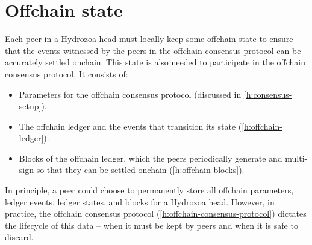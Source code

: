 \documentclass[../hydrozoa.tex]{subfiles}
\begin{document}
\chapter{Offchain state}%
\label{h:offchain-state}

Each peer in a Hydrozoa head must locally keep some offchain state to ensure that the events witnessed by the peers in the offchain consensus protocol can be accurately settled onchain.
This state is also needed to participate in the offchain consensus protocol.
It consists of:
\begin{itemize}
  \item Parameters for the offchain consensus protocol (discussed in \cref{h:consensus-setup}).
  \item The offchain ledger and the events that transition its state (\cref{h:offchain-ledger}).
  \item Blocks of the offchain ledger, which the peers periodically generate and multi-sign so that they can be settled onchain (\cref{h:offchain-blocks}).
\end{itemize}

In principle, a peer could choose to permanently store all offchain parameters, ledger events, ledger states, and blocks for a Hydrozoa head.
However, in practice, the offchain consensus protocol (\cref{h:offchain-consensus-protocol}) dictates the lifecycle of this data -- when it must be kept by peers and when it is safe to discard.
\end{document}
